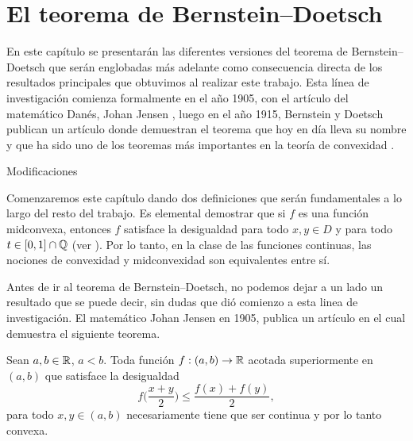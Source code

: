 \chapter{El teorema de Bernstein--Doetsch}
\label{chapPrevio}

En este capítulo se presentarán las diferentes versiones 
del teorema de Bernstein--Doetsch que serán englobadas más 
adelante como consecuencia directa de los resultados principales que
obtuvimos al realizar este trabajo. Esta línea de investigación
comienza formalmente en el año 1905, con el artículo del matemático 
Danés, Johan Jensen \cite{Jen06}, luego en el año 1915, Bernstein y Doetsch 
publican un artículo donde demuestran el teorema que hoy en día lleva su nombre 
y que ha sido uno de los teoremas más importantes en la teoría de convexidad \cite{Kuc09}. 

Modificaciones 

Comenzaremos este capítulo dando dos definiciones que serán fundamentales
a lo largo del resto del trabajo.
Es elemental demostrar que si $f$ es una función midconvexa,
entonces $f$ satisface la desigualdad  para todo
$x,y\in D$ y para todo $t\in[0,1]\cap\mathbb{Q}$ (ver \cite{Kuc09}). 
Por lo tanto, en la clase de las funciones continuas, las nociones
de convexidad y midconvexidad son equivalentes entre sí.

Antes de ir al teorema de Bernstein--Doetsch, no podemos dejar a un lado un resultado 
que se puede decir, sin dudas que dió comienzo a esta linea de investigación. 
El matemático Johan Jensen en 1905, 
publica un artículo en el cual demuestra el siguiente teorema. 

\begin{theorem}
\label{TJensenFirst}
Sean $a,b\in\mathbb{R}$, $a<b$. 
Toda función $f:(a,b)\to\mathbb{R}$ acotada superiormente en $(a,b)$ que satisface 
la desigualdad
$$
f\bigg(\frac{x+y}{2}\bigg)\leq \frac{f(x)+f(y)}{2},
$$
para todo $x,y\in (a,b)$ necesariamente tiene que ser continua
y por lo tanto convexa.
\end{theorem}

